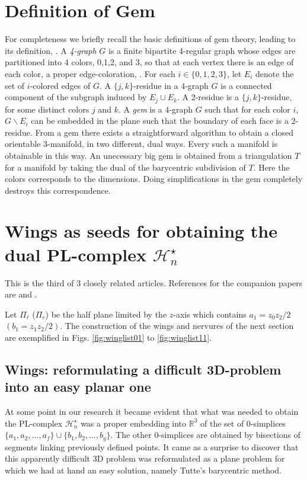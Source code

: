 \section{Definition of Gem}
For completeness we briefly recall the basic definitions of gem theory, leading to its definition, \cite{lins1995gca}.
A {\em 4-graph} $G$ is a finite bipartite 4-regular graph whose edges are partitioned into 4 colors,
0,1,2, and 3, 
so that at each vertex there is an edge of each color, a proper edge-coloration, \cite{bondy1976gta}.
For each $i \in \{0,1,2,3\}$, let $E_i$ denote the set of $i$-colored edges of $G$.
A $\{j,k\}$-residue in a $4$-graph $G$ is a connected component of the subgraph induced by $E_j \cup E_k$.
A 2-residue is a $\{j,k\}$-residue, for some distinct colors $j$ and $k$.
A {\em gem} is a 4-graph $G$ such that for each color $i$, $G\backslash E_i$ can be embedded in the plane 
such that the boundary of each face is a 2-residue. From a gem there exists a straightforward
algorithm to obtain a closed orientable 3-manifold, in two different, dual ways. Every such a manifold is obtainable in this way.
An unecessary big gem is obtained from a triangulation $T$ for a manifold by taking the dual of the 
barycentric subdivision of $T$. Here the colors corresponds to the dimensions. Doing simplifications in the gem
completely destroys this correspondence.


\section{Wings as seeds for obtaining the dual PL-complex $\mathcal{H}_n^\star$}

This is the third of 3 closely related articles.
References for the companion papers are \cite{linsmachadoA2012} and \cite{linsmachadoB2012}.

Let $\Pi_\ell$  ($\Pi_r$) be the half plane limited by the $z$-axis 
which contains $a_1=z_0z_2/2$ $(b_1=z_1z_2/2)$.
The construction of the wings and nervures of the next section are exemplified in Figs. \ref{fig:winglist01} to \ref{fig:winglist11}.

\subsection{Wings: reformulating a difficult 3D-problem 
into an easy planar one}\label{subsec:wings}

At some point in our research it became evident that what was needed to obtain the PL-complex $\mathcal{H}_n^\star$ 
was a proper embedding into $\mathbb{R}^3$ of the set of 0-simplices $\{a_1, a_2,\ldots,a_f\} \cup \{b_1, b_2,\ldots,b_g\}$.
The other 0-simplices are obtained by bisections of segments linking previously defined points. It came as a surprise to discover
that this apparently difficult 3D problem was reformulated as a plane problem for which we had at hand an easy solution,
namely Tutte's barycentric method.

